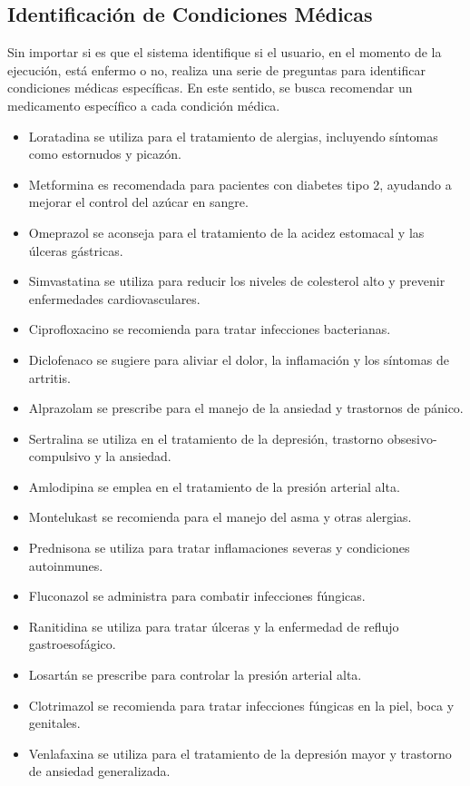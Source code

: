 \documentclass[11pt]{article}
\begin{document}
\begin{multicols}{2}
\subsection{Identificación de Condiciones Médicas}
Sin importar si es que el sistema identifique si el usuario, en el momento de la ejecución, está enfermo o no, realiza una serie de preguntas para identificar condiciones médicas específicas. En este sentido, se busca recomendar un medicamento específico a cada condición médica.
\begin{itemize}
    \item Loratadina se utiliza para el tratamiento de alergias, incluyendo síntomas como estornudos y picazón.
    \item Metformina es recomendada para pacientes con diabetes tipo 2, ayudando a mejorar el control del azúcar en sangre.
    \item Omeprazol se aconseja para el tratamiento de la acidez estomacal y las úlceras gástricas.
    \item Simvastatina se utiliza para reducir los niveles de colesterol alto y prevenir enfermedades cardiovasculares.
    \item Ciprofloxacino se recomienda para tratar infecciones bacterianas.
    \item Diclofenaco se sugiere para aliviar el dolor, la inflamación y los síntomas de artritis.
    \item Alprazolam se prescribe para el manejo de la ansiedad y trastornos de pánico.
    \item Sertralina se utiliza en el tratamiento de la depresión, trastorno obsesivo-compulsivo y la ansiedad.
    \item Amlodipina se emplea en el tratamiento de la presión arterial alta.
    \item Montelukast se recomienda para el manejo del asma y otras alergias.
    \item Prednisona se utiliza para tratar inflamaciones severas y condiciones autoinmunes.
    \item Fluconazol se administra para combatir infecciones fúngicas.
    \item Ranitidina se utiliza para tratar úlceras y la enfermedad de reflujo gastroesofágico.
    \item Losartán se prescribe para controlar la presión arterial alta.
    \item Clotrimazol se recomienda para tratar infecciones fúngicas en la piel, boca y genitales.
    \item Venlafaxina se utiliza para el tratamiento de la depresión mayor y trastorno de ansiedad generalizada.
\end{itemize}


\end{multicols}
\end{document}
